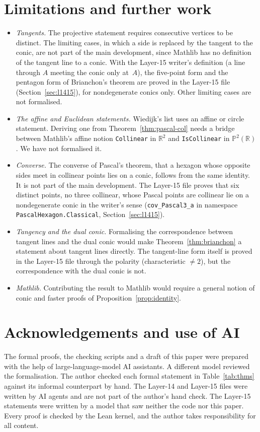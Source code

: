 \documentclass[11pt]{article}
\theoremstyle{remark}
\newcommand{\lean}[1]{\texttt{#1}}
\newcommand{\PP}{\mathbb{P}}
\begin{document}
\section{Limitations and further work}

\begin{itemize}
\item \emph{Tangents.} The projective statement requires consecutive vertices to be distinct.
The limiting cases, in which a side is replaced by the tangent to the conic, are not part of the
main development, since Mathlib has no definition of the tangent line to a conic. With the
Layer-15 writer's definition (a line through $A$ meeting the conic only at~$A$), the five-point form
and the pentagon form of Brianchon's theorem are proved in the Layer-15 file
(Section~\ref{sec:l1415}), for nondegenerate conics only. Other limiting cases are not formalised.
\item \emph{The affine and Euclidean statements.} Wiedijk's list uses an affine or circle statement.
Deriving one from Theorem~\ref{thm:pascal-col} needs a bridge between Mathlib's affine notion
\lean{Collinear} in $\mathbb{R}^2$ and \lean{IsCollinear} in $\PP^2(\mathbb{R})$. We have not
formalised it.
\item \emph{Converse.} The converse of Pascal's theorem, that a hexagon whose opposite sides meet in
collinear points lies on a conic, follows from the same identity. It is not part of the main development. The Layer-15 file proves that six distinct points, no three collinear, whose Pascal points are
collinear lie on a nondegenerate conic in the writer's sense
(\lean{cov\_Pascal3\_a} in namespace \lean{PascalHexagon.Classical}, Section~\ref{sec:l1415}).
\item \emph{Tangency and the dual conic.} Formalising the correspondence between tangent lines
and the dual conic would make Theorem~\ref{thm:brianchon} a statement about tangent lines directly.
The tangent-line form itself is proved in the Layer-15 file through the polarity (characteristic
$\ne2$), but the correspondence with the dual conic is not.
\item \emph{Mathlib.} Contributing the result to Mathlib would require a general notion of conic
and faster proofs of Proposition~\ref{prop:identity}.
\end{itemize}

\section*{Acknowledgements and use of AI}
The formal proofs, the checking scripts and a draft of this paper were prepared with the help of
large-language-model AI assistants. A different model reviewed the formalisation. The author checked each formal statement in
Table~\ref{tab:thms} against its informal counterpart by hand. The Layer-14 and Layer-15 files were written by AI
agents and are not part of the author's hand check. The Layer-15 statements were written by a model that saw neither the code nor this paper. Every proof is
checked by the Lean kernel, and the author takes responsibility for all content.
\end{document}
